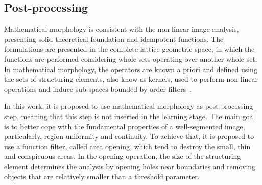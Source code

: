 
%

\subsection{Post-processing}
\label{ssec:post_processing}


Mathematical morphology is consistent with the non-linear image analysis, presenting solid theoretical foundation and idempotent functions. The formulations are presented in the complete lattice geometric space, in which the functions are performed considering whole sets operating over another whole set. In mathematical morphology, the operators are known a priori and defined using the sets of structuring elements, also know as kernels, used to perform non-linear operations and induce sub-spaces bounded by order filters~\cite{najman13}.

In this work, it is proposed to use mathematical morphology as post-processing step, meaning that this step is not inserted in the learning stage. The main goal is to better cope with the fundamental properties of a well-segmented image, particularly, region uniformity and continuity. To achieve that, it is proposed to use a function filter, called area opening, which tend to destroy the small, thin and conspicuous areas. In the opening operation, the size of the structuring element determines the analysis by opening holes near boundaries and removing objects that are relatively smaller than a threshold parameter.

